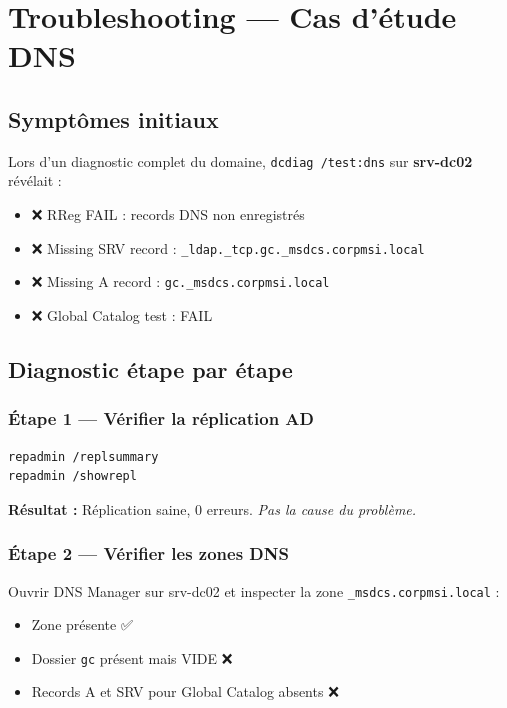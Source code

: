 \chapter{Troubleshooting — Cas d'étude DNS}

\section{Symptômes initiaux}

Lors d'un diagnostic complet du domaine, \texttt{dcdiag /test:dns} sur \textbf{srv-dc02} révélait :

\begin{itemize}
    \item ❌ RReg FAIL : records DNS non enregistrés
    \item ❌ Missing SRV record : \texttt{\_ldap.\_tcp.gc.\_msdcs.corpmsi.local}
    \item ❌ Missing A record : \texttt{gc.\_msdcs.corpmsi.local}
    \item ❌ Global Catalog test : FAIL
\end{itemize}

\section{Diagnostic étape par étape}

\subsection{Étape 1 — Vérifier la réplication AD}

\begin{lstlisting}[style=powershell]
repadmin /replsummary
repadmin /showrepl
\end{lstlisting}

\textbf{Résultat :} Réplication saine, 0 erreurs. \textit{Pas la cause du problème.}

\subsection{Étape 2 — Vérifier les zones DNS}

Ouvrir DNS Manager sur srv-dc02 et inspecter la zone \texttt{\_msdcs.corpmsi.local} :

\begin{itemize}
    \item Zone présente ✅
    \item Dossier \texttt{gc} présent mais VIDE ❌
    \item Records A et SRV pour Global Catalog absents ❌
\end{itemize}

